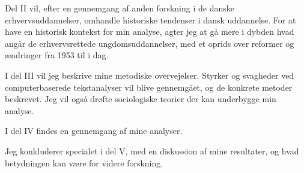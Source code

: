 Del II vil, efter en gennemgang af anden forskning i de danske erhvervsuddannelser, omhandle historiske tendenser i dansk uddannelse.
For at have en historisk kontekst for min analyse, agter jeg at gå mere i dybden hvad angår de erhvervsrettede ungdomsuddannelser, med et oprids over reformer og ændringer fra 1953 til i dag.

I del III vil jeg beskrive mine metodiske overvejelser.
Styrker og svagheder ved computerbaserede tekstanalyser vil blive gennemgået, og de konkrete metoder beskrevet.
Jeg vil også drøfte sociologiske teorier der kan underbygge min analyse. 

I del IV findes en gennemgang af mine analyser.

Jeg konkluderer specialet i del V, med en diskussion af mine resultater, og hvad betydningen kan være for videre forskning.

